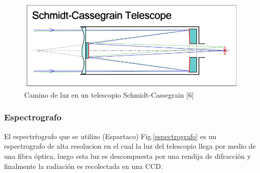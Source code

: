\documentclass[Proceedings]{ascelike}
\begin{document}
\begin{figure}
\centering
\includegraphics[scale=0.4]{SCT2.jpg}
\caption{Camino de luz en un telescopio Schmidt-Cassegrain [6] \label{la}}
\end{figure}


\subsubsection{Espectrografo}

El espectr\'rografo que se utilizo (Espartaco) Fig.\ref{espectrografo} es un espectrografo de alta resolucion en el cual la luz del telescopio llega por medio de una fibra \'optica, luego esta luz es descompuesta por una rendija de difracci\'on y finalmente la radiaci\'on es recolectada en una CCD.
\end{document}
